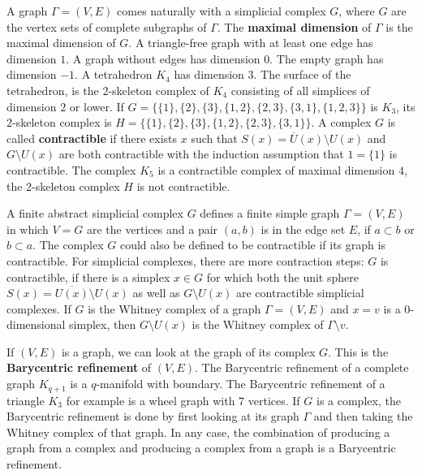 \documentclass[12pt]{amsart}
\begin{document}
\vspace{3mm}
A graph $\Gamma=(V,E)$ comes naturally with a simplicial complex $G$, where $G$ are the 
vertex sets of complete subgraphs of $\Gamma$. The {\bf maximal dimension} of $\Gamma$ is the 
maximal dimension of $G$. A triangle-free graph with at least one edge has dimension $1$. 
A graph without edges has dimension $0$. The empty graph has dimension $-1$. 
A tetrahedron $K_4$ has dimension $3$. The surface of 
the tetrahedron, is the 2-skeleton complex of $K_4$ consisting of all 
simplices of dimension $2$ or lower. If $G=\{ \{1\},\{2\},\{3\},\{1,2\},\{2,3\},\{3,1\},\{1,2,3\} \}$
is $K_3$, its 2-skeleton complex is 
$H=\{ \{1\},\{2\},\{3\},\{1,2\},\{2,3\},\{3,1\} \}$. A complex $G$ is called {\bf contractible}
if there exists $x$ such that $S(x)=\overline{U}(x) \setminus U(x)$ and $G \setminus U(x)$
are both contractible with the induction assumption that $1=\{ 1\}$ is contractible. 
The complex $K_5$ is a contractible complex of maximal dimension $4$, 
the $2$-skeleton complex $H$ is not contractible. 

\vspace{3mm}
A finite abstract simplicial complex $G$ defines a finite simple graph $\Gamma=(V,E)$ in which 
$V=G$ are the vertices and a pair $(a,b)$ is in the edge set $E$, if $a \subset b$ or $b \subset a$. 
The complex $G$ could also be defined to be contractible if its graph is contractible. 
For simplicial complexes, there are more contraction steps: $G$ is contractible, if there is 
a simplex $x \in G$ for which both the unit sphere $S(x)=\overline{U(x)} \setminus U(x)$ as well 
as $G \setminus U(x)$ are contractible simplicial complexes. If $G$ is the Whitney complex of a
graph $\Gamma=(V,E)$ and $x=v$ is a 0-dimensional simplex, then $G \setminus U(x)$ is the 
Whitney complex of $\Gamma \setminus v$.

\vspace{3mm}
If $(V,E)$ is a graph, we can look at the graph of its complex $G$. This is the
{\bf Barycentric refinement} of $(V,E)$. The Barycentric refinement of a complete
graph $K_{q+1}$ is a $q$-manifold with boundary. The Barycentric refinement of a 
triangle $K_3$ for example is a wheel graph with $7$ vertices. 
If $G$ is a complex, the Barycentric refinement is done by first looking at its 
graph $\Gamma$ and then taking the Whitney complex of that graph. 
In any case, the combination of producing a graph from a complex and producing a complex
from a graph is a Barycentric refinement. 
\end{document}

